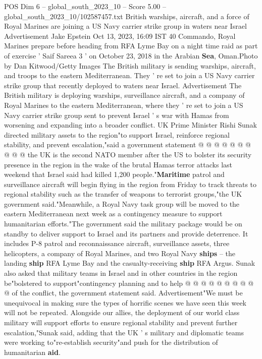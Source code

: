 \begin{textsample}{POS Dim 6 – global\_south\_2023\_10 – Score 5.00 – global\_south\_2023\_10/102587457.txt}  \label{ex:f6_pos_292}
British warships, aircraft, and a force of Royal Marines are joining a US Navy carrier strike group in waters near Israel Advertisement Jake Epstein Oct 13, 2023, 16:09 IST 40 Commando, Royal Marines prepare before heading from RFA Lyme Bay on a night time raid as part of exercise ' Saif Sareea 3 ' on October 23, 2018 in the Arabian \textbf{Sea}, Oman.Photo by Dan Kitwood/Getty Images The British military is sending warships, aircraft, and troops to the eastern Mediterranean.
They ' re set to join a US Navy carrier strike group that recently deployed to waters near Israel.
Advertisement The British military is deploying warships, surveillance aircraft, and a company of Royal Marines to the eastern Mediterranean, where they ' re set to join a US Navy carrier strike group sent to prevent Israel ' s war with Hamas from worsening and expanding into a broader conflict.
UK Prime Minister Rishi Sunak directed military assets to the region"to support Israel, reinforce regional stability, and prevent escalation,"said a government statement @ @ @ @ @ @ @ @ @ @ the UK is the second NATO member after the US to bolster its security presence in the region in the wake of the brutal Hamas terror attacks last weekend that Israel said had killed 1,200 people."\textbf{Maritime} patrol and surveillance aircraft will begin flying in the region from Friday to track threats to regional stability such as the transfer of weapons to terrorist groups,"the UK government said."Meanwhile, a Royal Navy task group will be moved to the eastern Mediterranean next week as a contingency measure to support humanitarian efforts."The government said the military package would be on standby to deliver support to Israel and its partners and provide deterrence.
It includes P-8 patrol and reconnaissance aircraft, surveillance assets, three helicopters, a company of Royal Marines, and two Royal Navy \textbf{ships} -- the landing \textbf{ship} RFA Lyme Bay and the casualty-receiving \textbf{ship} RFA Argus.
Sunak also asked that military teams in Israel and in other countries in the region be"bolstered to support"contingency planning and to help @ @ @ @ @ @ @ @ @ @ of the conflict, the government statement said.
Advertisement"We must be unequivocal in making sure the types of horrific scenes we have seen this week will not be repeated.
Alongside our allies, the deployment of our world class military will support efforts to ensure regional stability and prevent further escalation,"Sunak said, adding that the UK ' s military and diplomatic teams were working to"re-establish security"and push for the distribution of humanitarian \textbf{aid}.

\end{textsample}
